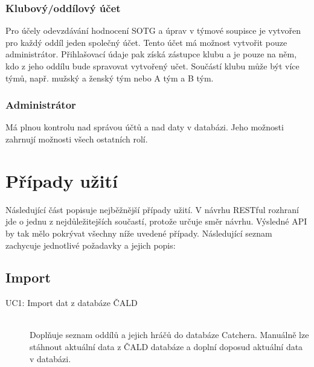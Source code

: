 \subsubsection*{Klubový/oddílový účet}

Pro účely odevzdávání hodnocení SOTG a úprav v týmové soupisce je vytvořen pro každý oddíl
jeden společný účet. Tento účet má možnost vytvořit pouze administrátor. Přihlašovací údaje pak
získá zástupce klubu a je pouze na něm, kdo z jeho oddílu bude spravovat vytvořený učet.
Součástí klubu může být více týmů, např. mužský a ženský tým nebo A tým a B tým.
  
\subsubsection*{Administrátor}
Má plnou kontrolu nad správou účtů a nad daty v databázi. Jeho možnosti zahrnují možnosti
všech ostatních rolí.

\section{Případy užití}

Následující část popisuje nejběžnější případy užití. V návrhu RESTful rozhraní jde
o jednu z nejdůležitejších součastí, protože určuje směr návrhu. Výsledné API by tak mělo
pokrývat všechny níže uvedené případy. Následující seznam zachycuje jednotlivé požadavky
a jejich popis:


\subsection*{Import}
  \begin{description}
    \item[UC1: Import dat z databáze ČALD] \hfill \\
    Doplňuje seznam oddílů a jejich hráčů do databáze Catchera. Manuálně lze stáhnout
    aktuální data z ČALD databáze a doplní doposud aktuální data v databázi.
  \end{description}

